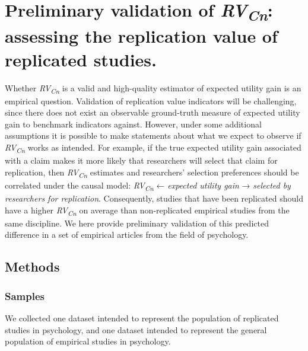 \documentclass[
  english,
  man,floatsintext]{apa6}
\begin{document}
\hypertarget{preliminary-validation-of-rvcn-assessing-the-replication-value-of-replicated-studies.}{%
\section{\texorpdfstring{Preliminary validation of \emph{RV\textsubscript{Cn}}: assessing the replication value of replicated studies.}{Preliminary validation of RVCn: assessing the replication value of replicated studies.}}\label{preliminary-validation-of-rvcn-assessing-the-replication-value-of-replicated-studies.}}

Whether \emph{RV\textsubscript{Cn}} is a valid and high-quality estimator of expected utility gain is an empirical question. Validation of replication value indicators will be challenging, since there does not exist an observable ground-truth measure of expected utility gain to benchmark indicators against. However, under some additional assumptions it is possible to make statements about what we expect to observe if \emph{RV\textsubscript{Cn}} works as intended. For example, if the true expected utility gain associated with a claim makes it more likely that researchers will select that claim for replication, then \emph{RV\textsubscript{Cn}} estimates and researchers' selection preferences should be correlated under the causal model: \emph{RV\textsubscript{Cn}} ← \emph{expected utility gain} → \emph{selected by researchers for replication}. Consequently, studies that have been replicated should have a higher \emph{RV\textsubscript{Cn}} on average than non-replicated empirical studies from the same discipline. We here provide preliminary validation of this predicted difference in a set of empirical articles from the field of psychology.

\hypertarget{methods}{%
\subsection{Methods}\label{methods}}

\hypertarget{samples}{%
\subsubsection{Samples}\label{samples}}

We collected one dataset intended to represent the population of replicated studies in psychology, and one dataset intended to represent the general population of empirical studies in psychology.
\end{document}
